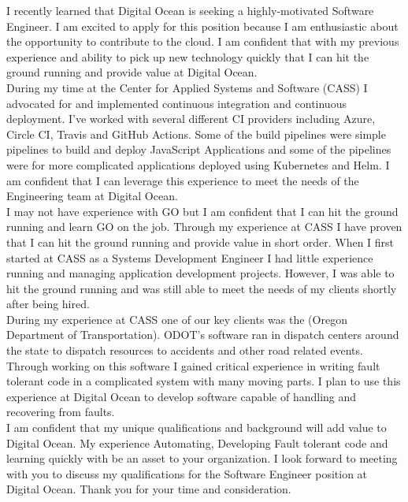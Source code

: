 \documentclass[11pt, a4paper]{awesome-cv}
\begin{document}
\makecvheader

\makelettertitle



\begin{cvletter}
    I recently learned that Digital Ocean is seeking a highly-motivated Software Engineer. I am excited to apply for this position because I am enthusiastic about the opportunity to contribute to the cloud. I am confident that with my previous experience and ability to pick up new technology quickly that I can hit the ground running and provide value at Digital Ocean.\\
    
    During my time at the Center for Applied Systems and Software (CASS) I advocated for and implemented continuous integration and continuous deployment. I've worked with several different CI providers including Azure, Circle CI, Travis and GitHub Actions. Some of the build pipelines were simple pipelines to build and deploy JavaScript Applications and some of the pipelines were for more complicated applications deployed using Kubernetes and Helm. I am confident that I can leverage this experience to meet the needs of the Engineering team at Digital Ocean.\\
    
    I may not have experience with GO but I am confident that I can hit the ground running and learn GO on the job. Through my experience at CASS I have proven that I can hit the ground running and provide value in short order. When I first started at CASS as a Systems Development Engineer I had little experience running and managing application development projects. However, I was able to hit the ground running and was still able to meet the needs of my clients shortly after being hired.\\ 
    
    During my experience at CASS one of our key clients was the (Oregon Department of Transportation). ODOT's software ran in dispatch centers around the state to dispatch resources to accidents and other road related events. Through working on this software I gained critical experience in writing fault tolerant code in a complicated system with many moving parts. I plan to use this experience at Digital Ocean to develop software capable of handling and recovering from faults.\\
    
    I am confident that my unique qualifications and background will add value to Digital Ocean. My experience Automating, Developing Fault tolerant code and learning quickly with be an asset to your organization. I look forward to meeting with you to discuss my qualifications for the Software Engineer position at Digital Ocean. Thank you for your time and consideration.\\
    

\end{cvletter}

\makeletterclosing
\end{document}
